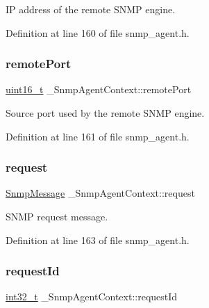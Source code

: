 IP address of the remote S\+N\+MP engine. 



Definition at line 160 of file snmp\+\_\+agent.\+h.

\mbox{\label{struct__SnmpAgentContext_aeafa1486998773b5f4e1f413ab53371e}} 
\subsubsection{\texorpdfstring{remote\+Port}{remotePort}}
{\footnotesize\ttfamily \hyperlink{stdint_8h_a273cf69d639a59973b6019625df33e30}{uint16\+\_\+t} \+\_\+\+Snmp\+Agent\+Context\+::remote\+Port}



Source port used by the remote S\+N\+MP engine. 



Definition at line 161 of file snmp\+\_\+agent.\+h.

\mbox{\label{struct__SnmpAgentContext_a7cf8a59f12dae2ba9f25ddf9095eba29}} 
\subsubsection{\texorpdfstring{request}{request}}
{\footnotesize\ttfamily \hyperlink{structSnmpMessage}{Snmp\+Message} \+\_\+\+Snmp\+Agent\+Context\+::request}



S\+N\+MP request message. 



Definition at line 163 of file snmp\+\_\+agent.\+h.

\mbox{\label{struct__SnmpAgentContext_a02553a8b02261e74a5d0ea3310334bf5}} 
\subsubsection{\texorpdfstring{request\+Id}{requestId}}
{\footnotesize\ttfamily \hyperlink{stdint_8h_ab1967d8591af1a4e48c37fd2b0f184d0}{int32\+\_\+t} \+\_\+\+Snmp\+Agent\+Context\+::request\+Id}



